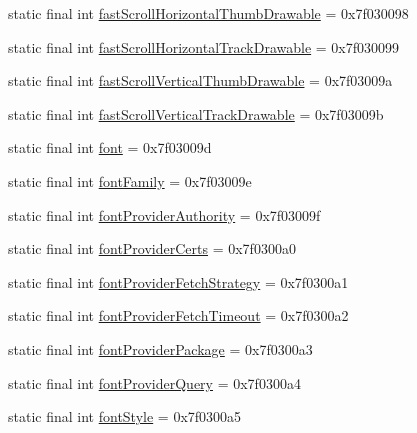 \begin{DoxyCompactItemize}
\item 
static final int \mbox{\hyperlink{classandroid_1_1support_1_1design_1_1_r_1_1attr_aa59487a99a0e8e5ebc17ac91c211adcd}{fast\+Scroll\+Horizontal\+Thumb\+Drawable}} = 0x7f030098
\item 
static final int \mbox{\hyperlink{classandroid_1_1support_1_1design_1_1_r_1_1attr_a7cf786e9baedda04c832d33839504397}{fast\+Scroll\+Horizontal\+Track\+Drawable}} = 0x7f030099
\item 
static final int \mbox{\hyperlink{classandroid_1_1support_1_1design_1_1_r_1_1attr_af1cb6f60b39eb79ccb79c25746af2f64}{fast\+Scroll\+Vertical\+Thumb\+Drawable}} = 0x7f03009a
\item 
static final int \mbox{\hyperlink{classandroid_1_1support_1_1design_1_1_r_1_1attr_a3c3952d5649ec718fd0d14de949a69eb}{fast\+Scroll\+Vertical\+Track\+Drawable}} = 0x7f03009b
\item 
static final int \mbox{\hyperlink{classandroid_1_1support_1_1design_1_1_r_1_1attr_ac64c32894b875c84fac5535fb0604ec6}{font}} = 0x7f03009d
\item 
static final int \mbox{\hyperlink{classandroid_1_1support_1_1design_1_1_r_1_1attr_af9123967cb1c1a08b75a8e47c73edfaf}{font\+Family}} = 0x7f03009e
\item 
static final int \mbox{\hyperlink{classandroid_1_1support_1_1design_1_1_r_1_1attr_a4a1de2d527e82ce9ba618bac92e678a8}{font\+Provider\+Authority}} = 0x7f03009f
\item 
static final int \mbox{\hyperlink{classandroid_1_1support_1_1design_1_1_r_1_1attr_a03e4b5678e0526d8f9af6bd5f9b5d26f}{font\+Provider\+Certs}} = 0x7f0300a0
\item 
static final int \mbox{\hyperlink{classandroid_1_1support_1_1design_1_1_r_1_1attr_a005550e60860b30a81e4b89cc3ecdcd0}{font\+Provider\+Fetch\+Strategy}} = 0x7f0300a1
\item 
static final int \mbox{\hyperlink{classandroid_1_1support_1_1design_1_1_r_1_1attr_af2920644bc3669b07801976532c7fb32}{font\+Provider\+Fetch\+Timeout}} = 0x7f0300a2
\item 
static final int \mbox{\hyperlink{classandroid_1_1support_1_1design_1_1_r_1_1attr_a64612dba5bb16762a9026d7a74d28739}{font\+Provider\+Package}} = 0x7f0300a3
\item 
static final int \mbox{\hyperlink{classandroid_1_1support_1_1design_1_1_r_1_1attr_add146e92dad3ce33dc850761e58ecb40}{font\+Provider\+Query}} = 0x7f0300a4
\item 
static final int \mbox{\hyperlink{classandroid_1_1support_1_1design_1_1_r_1_1attr_adff98e7087697457277b767e626def5a}{font\+Style}} = 0x7f0300a5

\end{DoxyCompactItemize}
